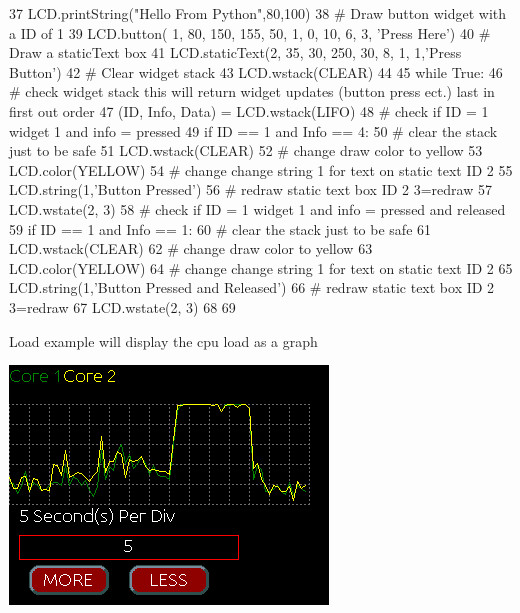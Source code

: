 \begin{DoxyCodeInclude}
37 LCD.printString(\textcolor{stringliteral}{"Hello From Python"},80,100)
38 \textcolor{comment}{# Draw button widget with a ID of 1}
39 LCD.button( 1,  80, 150, 155, 50, 1, 0, 10, 6, 3, \textcolor{stringliteral}{'Press Here'})
40 \textcolor{comment}{# Draw a staticText box}
41 LCD.staticText(2, 35, 30, 250, 30, 8, 1, 1,\textcolor{stringliteral}{'Press Button'})
42 \textcolor{comment}{# Clear widget stack}
43 LCD.wstack(CLEAR)
44 
45 \textcolor{keywordflow}{while} \textcolor{keyword}{True}:
46     \textcolor{comment}{# check widget stack this will return widget updates (button press ect.) last in first out order}
47     (ID, Info, Data) = LCD.wstack(LIFO)
48     \textcolor{comment}{# check if ID = 1 widget 1 and info = pressed }
49     \textcolor{keywordflow}{if} ID == 1 \textcolor{keywordflow}{and} Info == 4:
50         \textcolor{comment}{# clear the stack just to be safe}
51         LCD.wstack(CLEAR)
52         \textcolor{comment}{# change draw color to yellow}
53         LCD.color(YELLOW)
54         \textcolor{comment}{# change change string 1 for text on static text ID 2}
55         LCD.string(1,\textcolor{stringliteral}{'Button Pressed'})
56         \textcolor{comment}{# redraw static text box ID 2 3=redraw      }
57         LCD.wstate(2, 3)
58     \textcolor{comment}{# check if ID = 1 widget 1 and info = pressed and released}
59     \textcolor{keywordflow}{if} ID == 1 \textcolor{keywordflow}{and} Info == 1:
60         \textcolor{comment}{# clear the stack just to be safe}
61         LCD.wstack(CLEAR)
62         \textcolor{comment}{# change draw color to yellow}
63         LCD.color(YELLOW)
64         \textcolor{comment}{# change change string 1 for text on static text ID 2}
65         LCD.string(1,\textcolor{stringliteral}{'Button Pressed and Released'})
66         \textcolor{comment}{# redraw static text box ID 2 3=redraw}
67         LCD.wstate(2, 3)
68 
69         
\end{DoxyCodeInclude}


Load example will display the cpu load as a graph \par
  
\begin{DoxyImageNoCaption}
  \mbox{\includegraphics{load.png}}
\end{DoxyImageNoCaption}
 
